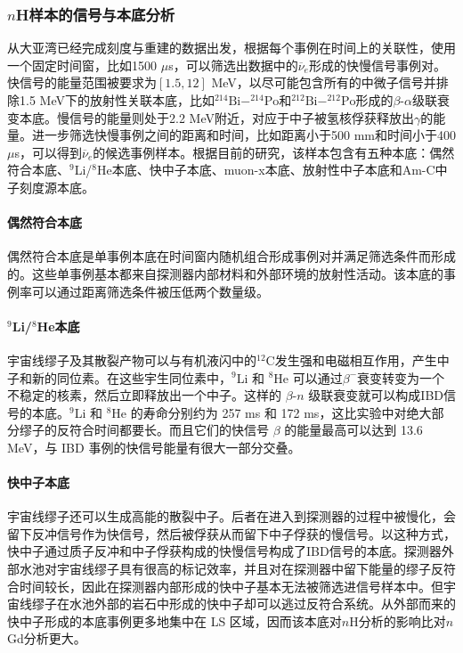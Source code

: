 \documentclass[a4paper,zihao=-4]{article}
\begin{document}
\subsubsection{$n$H样本的信号与本底分析}\label{sec:backgrounds}
从大亚湾已经完成刻度与重建的数据出发，根据每个事例在时间上的关联性，使用一个固定时间窗，比如1500 $\mu$s，可以筛选出数据中的$\overline{\nu}_e$形成的快慢信号事例对。快信号的能量范围被要求为$[1.5, 12]$ MeV，以尽可能包含所有的中微子信号并排除1.5 MeV下的放射性关联本底，比如$^{214}\text{Bi}-^{214}\text{Po}$和$^{212}\text{Bi}-^{212}\text{Po}$形成的$\beta$-$\alpha$级联衰变本底。慢信号的能量则处于2.2 MeV附近，对应于中子被氢核俘获释放出$\gamma$的能量。进一步筛选快慢事例之间的距离和时间，比如距离小于500 mm和时间小于400 $\mu$s，可以得到$\overline{\nu}_e$的候选事例样本。根据目前的研究，该样本包含有五种本底：偶然符合本底、$^9$Li/$^8$He本底、快中子本底、muon-x本底、放射性中子本底和Am-C中子刻度源本底。

\paragraph{偶然符合本底}

偶然符合本底是单事例本底在时间窗内随机组合形成事例对并满足筛选条件而形成的。这些单事例基本都来自探测器内部材料和外部环境的放射性活动。该本底的事例率可以通过距离筛选条件被压低两个数量级。

\paragraph{$^9$Li/$^8$He本底}宇宙线缪子及其散裂产物可以与有机液闪中的$^{12}$C发生强和电磁相互作用，产生中子和新的同位素。在这些宇生同位素中，$^9$Li 和 $^8$He 可以通过$\beta^-$衰变转变为一个不稳定的核素，然后立即释放出一个中子。这样的 $\beta$-$n$ 级联衰变就可以构成IBD信号的本底。$^9$Li 和 $^8$He 的寿命分别约为 257 ms 和 172 ms，这比实验中对绝大部分缪子的反符合时间都要长。而且它们的快信号 $\beta$ 的能量最高可以达到 13.6 MeV，与 IBD 事例的快信号能量有很大一部分交叠。
\paragraph{快中子本底}宇宙线缪子还可以生成高能的散裂中子。后者在进入到探测器的过程中被慢化，会留下反冲信号作为快信号，然后被俘获从而留下中子俘获的慢信号。以这种方式，快中子通过质子反冲和中子俘获构成的快慢信号构成了IBD信号的本底。探测器外部水池对宇宙线缪子具有很高的标记效率，并且对在探测器中留下能量的缪子反符合时间较长，因此在探测器内部形成的快中子基本无法被筛选进信号样本中。但宇宙线缪子在水池外部的岩石中形成的快中子却可以逃过反符合系统。从外部而来的快中子形成的本底事例更多地集中在 LS 区域，因而该本底对$n$H分析的影响比对$n$Gd分析更大。
\end{document}
